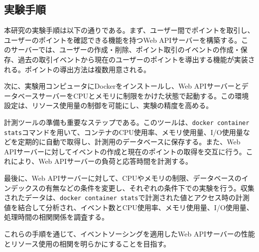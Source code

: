 \documentclass[../../../main]{subfiles}
\begin{document}
    \subsection{実験手順}\label{subsec:method-procedure}

    本研究の実験手順は以下の通りである。まず、ユーザー間でポイントを取引し、ユーザーのポイントを確認できる機能を持つWeb APIサーバーを構築する。このサーバーでは、ユーザーの作成・削除、ポイント取引のイベントの作成・保存、過去の取引イベントから現在のユーザーのポイントを導出する機能が実装される。ポイントの導出方法は複数用意される。

    次に、実験用コンピュータにDockerをインストールし、Web APIサーバーとデータベースサーバーをCPUとメモリに制限をかけた状態で起動する。この環境設定は、リソース使用量の制御を可能にし、実験の精度を高める。

    計測ツールの準備も重要なステップである。このツールは、\texttt{docker container stats}コマンドを用いて、コンテナのCPU使用率、メモリ使用量、I/O使用量などを定期的に自動で取得し、計測用のデータベースに保存する。また、Web APIサーバーに対してイベントの作成と現在のポイントの取得を交互に行う。これにより、Web APIサーバーの負荷と応答時間を計測する。

    最後に、Web APIサーバーに対して、CPUやメモリの制限、データベースのインデックスの有無などの条件を変更し、それぞれの条件下での実験を行う。収集されたデータは、\texttt{docker container stats}で計測された値とアクセス時の計測値を結合して分析され、イベント数とCPU使用率、メモリ使用量、I/O使用量、処理時間の相関関係を調査する。

    これらの手順を通じて、イベントソーシングを適用したWeb APIサーバーの性能とリソース使用の相関を明らかにすることを目指す。
\end{document}
